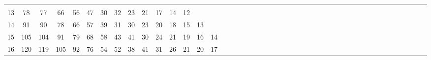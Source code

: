 \documentclass[12pt,a4paper]{amsart}
\theoremstyle{definition} %
\theoremstyle{plain} %
\begin{document}
\begin{table}[h]
{\begin{tabular}{|c|*{44}{c|}}
                         &             &             &             &             &             &             &             &             &             &             &             &             &             &             &             &             &             &             &             &             &             &             &             &             &             &             &             &             &             \\
                13 &         78 &         77 &         66 &         56 &         47 &         30 &         32 &         23 &         21 &          17 &          14 &          12 &             &             &   
                         &             &             &             &             &             &             &             &             &             &             &             &             &             &             &             &             &             &             &             &             &             &             &             &             &             &             &             &             &             \\
                14 &         91 &         90 &         78 &         66 &         57 &         39 &         31 &         30 &         23 &          20 &          18 &          15 &          13 &             &   
                         &             &             &             &             &             &             &             &             &             &             &             &             &             &             &             &             &             &             &             &             &             &             &             &             &             &             &             &             &             \\
                15 &        105 &        104 &         91 &         79 &         68 &         58 &         43 &         41 &         30 &          24 &          21 &          19 &          16 &          14 &   
                         &             &             &             &             &             &             &             &             &             &             &             &             &             &             &             &             &             &             &             &             &             &             &             &             &             &             &             &             &             \\
                16 &        120 &        119 &        105 &         92 &         76 &         54 &         52 &         38 &         41 &          31 &          26 &          21 &          20 &          17 &   

\end{tabular}}
\end{table}
\end{document}
